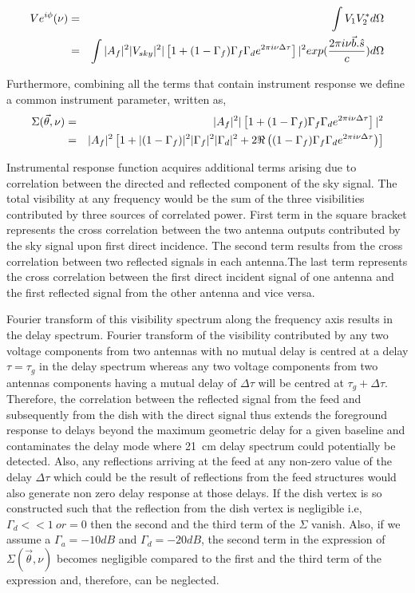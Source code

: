 \documentclass[12pt,preprint]{aastex}
\begin{document}
\begin{eqnarray}
V e^{i\phi}(\nu) & = & \int V_{1}V_{2}^{*} d\Omega \nonumber\\
		        & = & \int |A_{f}|^{2}|V_{sky}|^{2} |\left [ 1+(1-\Gamma_{f}) \Gamma_{f} \Gamma_{d} e^{2\pi i\nu \Delta \tau}  \right]|^{2} exp({2\pi i \nu \vec{b}.\hat{s} \over c} ) d\Omega
\label{eq6}		        
\end{eqnarray}


 Furthermore, combining all the terms that contain instrument response we define a common instrument parameter, written as, 
\begin{eqnarray}
\Sigma(\vec \theta, \nu) & = & |A_{f}|^{2} |\left [ 1+ (1-\Gamma_{f}) \Gamma_{f} \Gamma_{d} e^{2\pi i\nu \Delta \tau} \right]|^{2}\nonumber\\
 	    & = &  |A_{f}|^{2}  \left[ 1+ |(1-\Gamma_{f})|^{2}|\Gamma_{f}|^{2}|\Gamma_{d}|^{2} + 2 \Re \left ( (1-\Gamma_{f})\Gamma_{f}\Gamma_{d} e^{2\pi i\nu \Delta \tau} \right) \right] 
\label{eq{7}}	    
\end{eqnarray} 

Instrumental response function acquires additional terms arising due to correlation between the directed and reflected component of the sky signal. The total visibility at any frequency would be the sum of the three visibilities contributed by three sources of correlated power. First term in the square bracket represents the cross correlation between the two antenna outputs contributed by the sky signal upon first direct incidence. The second term results from the cross correlation between two reflected signals in each antenna.The last term represents the cross correlation between the first direct incident signal of one antenna and the first reflected signal from the other antenna and vice versa.

Fourier transform of this visibility spectrum along the frequency axis results in the delay spectrum. 
 Fourier transform of the visibility contributed by any two voltage components from two antennas with no mutual delay is centred at a delay $\tau = \tau_{g}$ in the delay spectrum whereas any two voltage components from two antennas components having a mutual delay of $\Delta \tau$ will be centred at $\tau_{g} +\Delta \tau$. Therefore, the correlation between the reflected signal  from the feed and subsequently from the dish with the direct signal thus extends the foreground response to delays beyond the maximum geometric delay for a given baseline and contaminates the delay mode where 21~cm delay spectrum could potentially be detected. Also, any reflections arriving at the feed at any non-zero  value of the delay $\Delta \tau$ which could be the result of reflections from the feed structures would also generate non zero delay response at those delays. 
If the dish vertex is so constructed such that the reflection from the dish vertex is negligible i.e, $\Gamma_{d}<<1\ or = 0$ then the second and the third term of the $\Sigma$ vanish. Also, if we assume a $\Gamma_{a} =-10dB$ and $\Gamma_{d}= -20dB$, the second term in the expression of $\Sigma(\vec \theta, \nu)$ becomes negligible compared to the first and the third term of the expression and, therefore, can be neglected. \\
\end{document}

